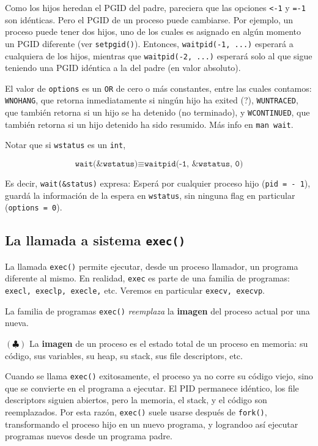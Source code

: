 \documentclass[12pt]{article}
\theoremstyle{definition}
\begin{document}
Como los hijos heredan el PGID del padre, pareciera que las opciones \texttt{<-1}
y \texttt{=-1} son idénticas. Pero el PGID de un proceso puede cambiarse. Por
ejemplo, un proceso puede tener dos hijos, uno de los cuales es asignado en
algún momento un PGID diferente (ver \texttt{setpgid()}). Entonces,
\texttt{waitpid(-1, ...)} esperará a cualquiera de los hijos, mientras que 
\texttt{waitpid(-2, ...)} esperará solo al que sigue teniendo una PGID idéntica
a la del padre (en valor absoluto).

El valor de \texttt{options} es un \texttt{OR} de cero o más constantes, entre
las cuales contamos: \texttt{WNOHANG}, que retorna inmediatamente si ningún hijo
ha exited (?), \texttt{WUNTRACED}, que también retorna si un hijo se ha detenido
(no terminado), y \texttt{WCONTINUED}, que también retorna si un hijo detenido
ha sido resumido. Más info en \texttt{man wait}.

Notar que si \texttt{wstatus} es un \texttt{int},

\begin{equation*}
    \texttt{wait(&wstatus)} \equiv \texttt{waitpid(-1, &wstatus, 0)}
\end{equation*}

Es decir, \texttt{wait(&status)} expresa: Esperá por cualquier proceso hijo
(\texttt{pid = - 1}), guardá la información de la espera en \texttt{wstatus},
sin ninguna flag en particular (\texttt{options = 0}).

\subsection{La llamada a sistema \texttt{exec()}}

La llamada \texttt{exec()} permite ejecutar, desde un proceso llamador, un
programa diferente al mismo. En realidad, \texttt{exec} es parte de una familia
de programas: \texttt{execl, execlp, execle,} etc. Veremos en particular 
\texttt{execv, execvp}.

La familia de programas \texttt{exec()} \textit{reemplaza} la \textbf{imagen}
del proceso actual por una nueva.

\begin{shaded}
    $(\clubsuit)$ La \textbf{imagen} de un proceso es el estado total de un
    proceso en memoria: su código, sus variables, su heap, su stack,  sus file
    descriptors, etc.
\end{shaded}

Cuando se llama \texttt{exec()} exitosamente, el proceso ya no corre su código
viejo, sino que se convierte en el programa a ejecutar. El PID permanece
idéntico, los file descriptors siguien abiertos, pero la memoria, el stack, y el
código son reemplazados. Por esta razón, \texttt{exec()} suele usarse después de
\texttt{fork()}, transformando el proceso hijo en un nuevo programa, y lograndoo
así ejecutar programas nuevos desde un programa padre.
\end{document}
